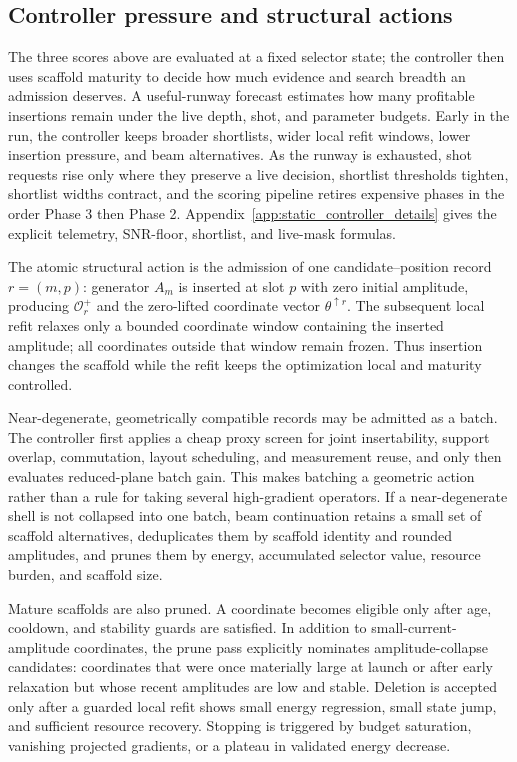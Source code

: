 \documentclass[
  reprint,
  amsmath,
  amssymb,
  aps,
  pra,
  nofootinbib,
  superscriptaddress,
  floatfix
]{revtex4-2}
\newcommand{\Oset}{\mathcal{O}}
\begin{document}
\subsection{Controller pressure and structural actions}

The three scores above are evaluated at a fixed selector state; the controller then uses scaffold maturity to decide how much evidence and search breadth an admission deserves. A useful-runway forecast estimates how many profitable insertions remain under the live depth, shot, and parameter budgets. Early in the run, the controller keeps broader shortlists, wider local refit windows, lower insertion pressure, and beam alternatives. As the runway is exhausted, shot requests rise only where they preserve a live decision, shortlist thresholds tighten, shortlist widths contract, and the scoring pipeline retires expensive phases in the order Phase 3 then Phase 2. Appendix~\ref{app:static_controller_details} gives the explicit telemetry, SNR-floor, shortlist, and live-mask formulas.

The atomic structural action is the admission of one candidate--position record $r=(m,p)$: generator $A_m$ is inserted at slot $p$ with zero initial amplitude, producing $\Oset_r^+$ and the zero-lifted coordinate vector $\theta^{\uparrow r}$. The subsequent local refit relaxes only a bounded coordinate window containing the inserted amplitude; all coordinates outside that window remain frozen. Thus insertion changes the scaffold while the refit keeps the optimization local and maturity controlled.

Near-degenerate, geometrically compatible records may be admitted as a batch. The controller first applies a cheap proxy screen for joint insertability, support overlap, commutation, layout scheduling, and measurement reuse, and only then evaluates reduced-plane batch gain. This makes batching a geometric action rather than a rule for taking several high-gradient operators. If a near-degenerate shell is not collapsed into one batch, beam continuation retains a small set of scaffold alternatives, deduplicates them by scaffold identity and rounded amplitudes, and prunes them by energy, accumulated selector value, resource burden, and scaffold size.

Mature scaffolds are also pruned. A coordinate becomes eligible only after age, cooldown, and stability guards are satisfied. In addition to small-current-amplitude coordinates, the prune pass explicitly nominates amplitude-collapse candidates: coordinates that were once materially large at launch or after early relaxation but whose recent amplitudes are low and stable. Deletion is accepted only after a guarded local refit shows small energy regression, small state jump, and sufficient resource recovery. Stopping is triggered by budget saturation, vanishing projected gradients, or a plateau in validated energy decrease.
\end{document}
